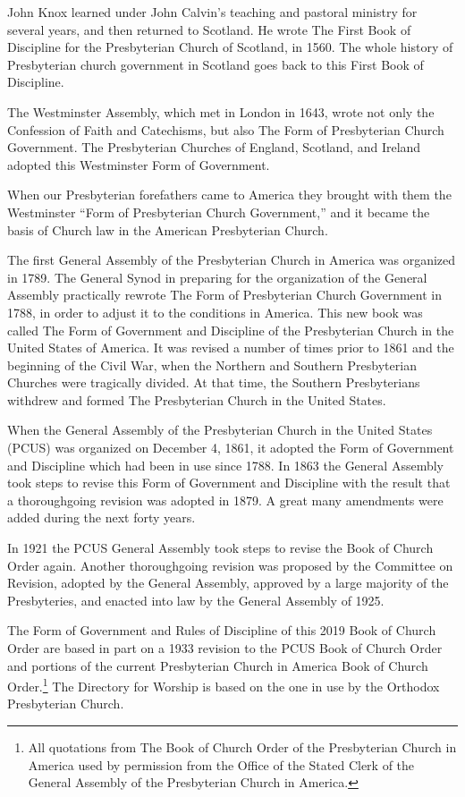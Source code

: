 \documentclass[
]{book}
\begin{document}
John Knox learned under John Calvin's teaching and pastoral ministry for several years, and then returned to Scotland. He wrote The First Book of Discipline for the Presbyterian Church of Scotland, in 1560. The whole history of Presbyterian church government in Scotland goes back to this First Book of Discipline.

The Westminster Assembly, which met in London in 1643, wrote not only the Confession of Faith and Catechisms, but also The Form of Presbyterian Church Government. The Presbyterian Churches of England, Scotland, and Ireland adopted this Westminster Form of Government.

When our Presbyterian forefathers came to America they brought with them the Westminster ``Form of Presbyterian Church Government,'' and it became the basis of Church law in the American Presbyterian Church.

The first General Assembly of the Presbyterian Church in America was organized in 1789. The General Synod in preparing for the organization of the General Assembly practically rewrote The Form of Presbyterian Church Government in 1788, in order to adjust it to the conditions in America. This new book was called The Form of Government and Discipline of the Presbyterian Church in the United States of America. It was revised a number of times prior to 1861 and the beginning of the Civil War, when the Northern and Southern Presbyterian Churches were tragically divided. At that time, the Southern Presbyterians withdrew and formed The Presbyterian Church in the United States.

When the General Assembly of the Presbyterian Church in the United States (PCUS) was organized on December 4, 1861, it adopted the Form of Government and Discipline which had been in use since 1788. In 1863 the General Assembly took steps to revise this Form of Government and Discipline with the result that a thoroughgoing revision was adopted in 1879. A great many amendments were added during the next forty years.

In 1921 the PCUS General Assembly took steps to revise the Book of Church Order again. Another thoroughgoing revision was proposed by the Committee on Revision, adopted by the General Assembly, approved by a large majority of the Presbyteries, and enacted into law by the General Assembly of 1925.

The Form of Government and Rules of Discipline of this 2019 Book of Church Order are based in part on a 1933 revision to the PCUS Book of Church Order and portions of the current Presbyterian Church in America Book of Church Order.\footnote{All quotations from The Book of Church Order of the Presbyterian Church in America used by permission from the Office of the Stated Clerk of the General Assembly of the Presbyterian Church in America.} The Directory for Worship is based on the one in use by the Orthodox Presbyterian Church.
\end{document}
